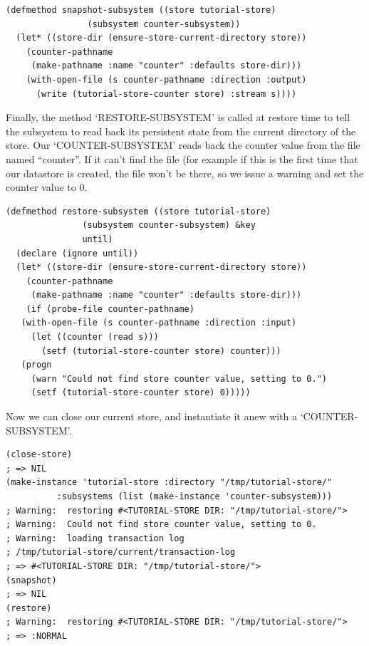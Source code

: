 \begin{Verbatim}[fontsize=\small,frame=leftline,framerule=0.9mm,rulecolor=\color{gray},framesep=5.1mm,xleftmargin=5mm,fontfamily=cmtt]
(defmethod snapshot-subsystem ((store tutorial-store)
                (subsystem counter-subsystem))
  (let* ((store-dir (ensure-store-current-directory store))
    (counter-pathname
     (make-pathname :name "counter" :defaults store-dir)))
    (with-open-file (s counter-pathname :direction :output)
      (write (tutorial-store-counter store) :stream s))))
\end{Verbatim}
Finally, the method `RESTORE-SUBSYSTEM' is called at restore time
to tell the subsystem to read back its persistent state from the
current directory of the store. Our `COUNTER-SUBSYSTEM' reads back
the counter value from the file named ``counter''. If it can't find
the file (for example if this is the first time that our datastore
is created, the file won't be there, so we issue a warning and set
the counter value to 0.

\begin{Verbatim}[fontsize=\small,frame=leftline,framerule=0.9mm,rulecolor=\color{gray},framesep=5.1mm,xleftmargin=5mm,fontfamily=cmtt]
(defmethod restore-subsystem ((store tutorial-store)
               (subsystem counter-subsystem) &key
               until)
  (declare (ignore until))
  (let* ((store-dir (ensure-store-current-directory store))
    (counter-pathname
     (make-pathname :name "counter" :defaults store-dir)))
    (if (probe-file counter-pathname)
   (with-open-file (s counter-pathname :direction :input)
     (let ((counter (read s)))
       (setf (tutorial-store-counter store) counter)))
   (progn
     (warn "Could not find store counter value, setting to 0.")
     (setf (tutorial-store-counter store) 0)))))
\end{Verbatim}
Now we can close our current store, and instantiate it anew with a
`COUNTER-SUBSYSTEM'.

\begin{Verbatim}[fontsize=\small,frame=leftline,framerule=0.9mm,rulecolor=\color{gray},framesep=5.1mm,xleftmargin=5mm,fontfamily=cmtt]
(close-store)
; => NIL
(make-instance 'tutorial-store :directory "/tmp/tutorial-store/"
          :subsystems (list (make-instance 'counter-subsystem)))
; Warning:  restoring #<TUTORIAL-STORE DIR: "/tmp/tutorial-store/">
; Warning:  Could not find store counter value, setting to 0.
; Warning:  loading transaction log
; /tmp/tutorial-store/current/transaction-log
; => #<TUTORIAL-STORE DIR: "/tmp/tutorial-store/">
(snapshot)
; => NIL
(restore)
; Warning:  restoring #<TUTORIAL-STORE DIR: "/tmp/tutorial-store/">
; => :NORMAL
\end{Verbatim}


